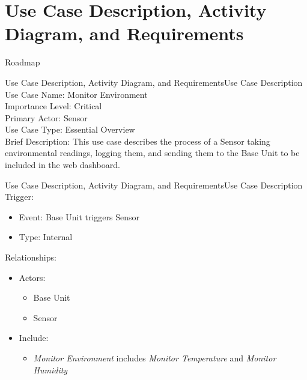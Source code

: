 \documentclass{beamer}
\begin{document}
  \renewcommand{\sectitle}{Use Case Description, Activity Diagram, and Requirements}
  \section{\sectitle}
  \begin{frame}{Roadmap}
    \tableofcontents[currentsection]
  \end{frame}

  \begin{frame}{\sectitle}{Use Case Description}
    Use Case Name: Monitor Environment\\
    Importance Level: Critical\\
    Primary Actor: Sensor\\
    Use Case Type: Essential Overview\\
    \vspace*{1em}
    Brief Description: This use case describes the process of a Sensor taking environmental readings, logging them, and sending them to the Base Unit to be included in the web dashboard.
  \end{frame}

  \begin{frame}{\sectitle}{Use Case Description}
    Trigger:
    \begin{itemize}
      \item Event: Base Unit triggers Sensor
      \item Type: Internal
    \end{itemize}
    \vspace*{1em}
    Relationships:
    \begin{itemize}
      \item Actors:
      \begin{itemize}
        \item Base Unit
        \item Sensor
      \end{itemize}
      \item Include:
      \begin{itemize}
        \item \textit{Monitor Environment} includes \textit{Monitor Temperature} and \textit{Monitor Humidity}
      \end{itemize}
    \end{itemize}
  \end{frame}
\end{document}
